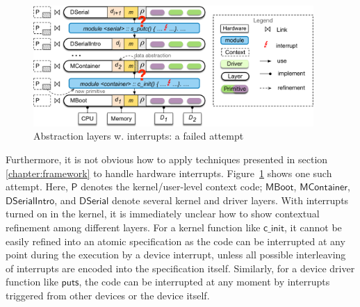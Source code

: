 \begin{figure}[t]
	\begin{center}
		\includegraphics[width=0.95\textwidth]{figs/layer_pre}
	\end{center}
	\caption{Abstraction layers w. interrupts: a failed attempt}
	\label{fig:layer_pre}
\end{figure}

Furthermore, it is not obvious how to apply techniques presented
in section \ref{chapter:framework}
to handle hardware interrupts. Figure~\ref{fig:layer_pre} shows one
such attempt.  Here, $\textsf{P}$ denotes the kernel/user-level
context code; $\textsf{MBoot}$, $\textsf{MContainer}$,
$\textsf{DSerialIntro}$, and $\textsf{DSerial}$ denote several kernel
and driver layers.  With interrupts turned on in the kernel, it is
immediately unclear how to show contextual refinement among different
layers. For a kernel function like $\textsf{c\_init}$, it cannot be
easily refined into an atomic specification as the code can be
interrupted at any point during the execution by a device interrupt,
unless all possible interleaving of interrupts are encoded into the
specification itself. Similarly, for a device driver function like
$\textsf{puts}$, the code can be interrupted at any moment by
interrupts triggered from other devices or the device itself.



